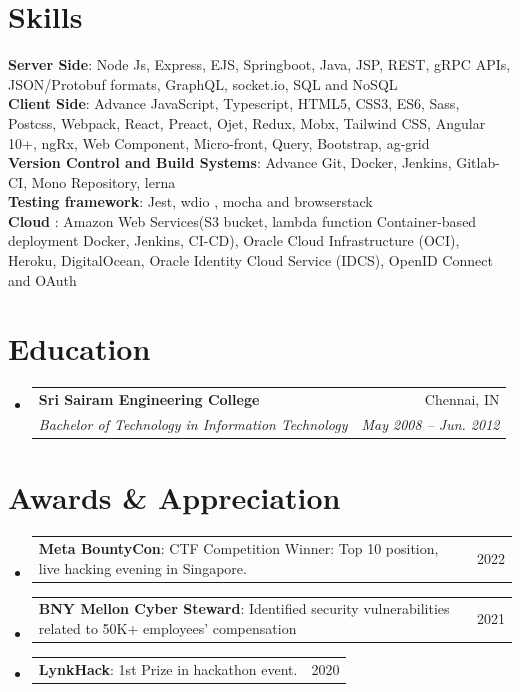 \documentclass[a4paper,20pt]{article}
\makeatletter
\newcommand{\resumeSubheading}[4]{
  \vspace{-2pt}\item
    \begin{tabular*}{0.97\textwidth}[t]{l@{\extracolsep{\fill}}r}
      \textbf{#1} & #2 \\
      \textit{\small#3} & \textit{\small #4} \\
    \end{tabular*}\vspace{-7pt}
}
\newcommand{\resumeProjectHeading}[2]{
    \item
    \begin{tabular*}{0.97\textwidth}{l@{\extracolsep{\fill}}r}
      \small#1 & #2 \\
    \end{tabular*}\vspace{-7pt}
}
\newcommand{\resumeSubHeadingListStart}{\begin{itemize}[leftmargin=0.15in, label={}]}
\newcommand{\resumeSubHeadingListEnd}{\end{itemize}}
\makeatother
\begin{document}
\section{Skills}
 \begin{itemize}[leftmargin=0.15in, label={}]
    \small{\item{
     \textbf{Server Side}{: Node Js, Express, EJS, Springboot, Java, JSP, REST, gRPC APIs, JSON/Protobuf formats, GraphQL, socket.io, SQL and NoSQL} \\
     \textbf{Client Side}{: Advance JavaScript, Typescript, HTML5, CSS3, ES6, Sass, Postcss, Webpack, React, Preact, Ojet, Redux, Mobx, Tailwind CSS, Angular 10+, ngRx, Web Component, Micro-front, Query, Bootstrap, ag-grid} \\
     \textbf{Version Control and Build Systems}{: Advance Git, Docker, Jenkins, Gitlab-CI, Mono Repository, lerna } \\
     \textbf{Testing framework}{: Jest, wdio , mocha and browserstack} \\
     \textbf{Cloud }{: Amazon Web Services(S3 bucket, lambda function Container-based deployment Docker, Jenkins, CI-CD), Oracle Cloud Infrastructure (OCI), Heroku, DigitalOcean, Oracle Identity Cloud Service (IDCS), OpenID Connect and OAuth}
    }}
 \end{itemize}

\section{Education}
  \resumeSubHeadingListStart
    \resumeSubheading
      {Sri Sairam Engineering College}{Chennai, IN}
      {Bachelor of Technology in Information Technology}{May 2008 -- Jun. 2012}
  \resumeSubHeadingListEnd

\section{Awards \& Appreciation }
    \resumeSubHeadingListStart
      \resumeProjectHeading
          {\textbf{Meta BountyCon}{: CTF Competition Winner: Top 10 position, live hacking evening in Singapore.}}{2022}
      \resumeProjectHeading
          {\textbf{BNY Mellon Cyber Steward}{: Identified security vulnerabilities related to 50K+ employees’ compensation}}{2021}
       \resumeProjectHeading
          {\textbf{LynkHack}{: 1st Prize in hackathon event.}}{2020}
    \resumeSubHeadingListEnd
%
\end{document}
